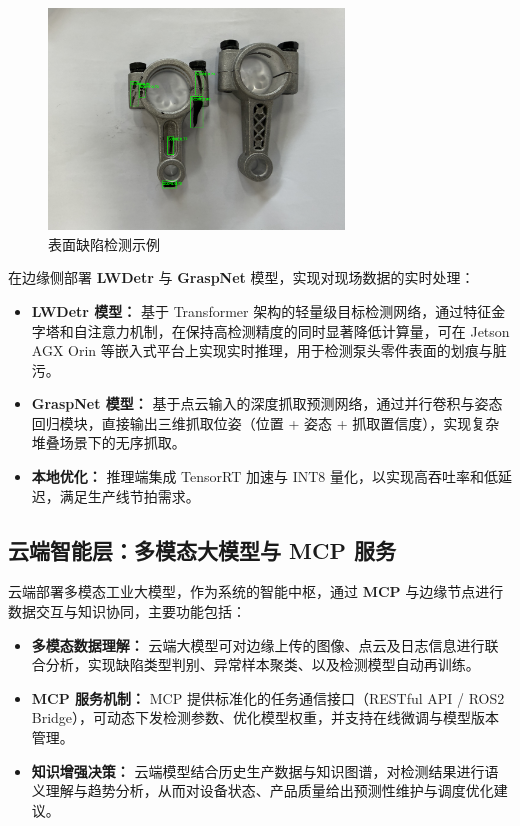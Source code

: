 \documentclass{cumcmthesis}
\begin{document}
\begin{figure}\centering
\includegraphics[width=0.7\textwidth]{result.png}
\caption{表面缺陷检测示例}\label{fig:defect_examples}
\end{figure}
在边缘侧部署 \textbf{LWDetr} 与 \textbf{GraspNet} 模型，实现对现场数据的实时处理：


\begin{itemize}
    \item \textbf{LWDetr 模型：}  
    基于 Transformer 架构的轻量级目标检测网络，通过特征金字塔和自注意力机制，在保持高检测精度的同时显著降低计算量，可在 Jetson AGX Orin 等嵌入式平台上实现实时推理，用于检测泵头零件表面的划痕与脏污。

    \item \textbf{GraspNet 模型：}  
    基于点云输入的深度抓取预测网络，通过并行卷积与姿态回归模块，直接输出三维抓取位姿（位置 + 姿态 + 抓取置信度），实现复杂堆叠场景下的无序抓取。

    \item \textbf{本地优化：}  
    推理端集成 TensorRT 加速与 INT8 量化，以实现高吞吐率和低延迟，满足生产线节拍需求。
\end{itemize}

\subsection{云端智能层：多模态大模型与 MCP 服务}

云端部署多模态工业大模型，作为系统的智能中枢，通过 \textbf{MCP} 与边缘节点进行数据交互与知识协同，主要功能包括：


\begin{itemize}
    \item \textbf{多模态数据理解：}  
    云端大模型可对边缘上传的图像、点云及日志信息进行联合分析，实现缺陷类型判别、异常样本聚类、以及检测模型自动再训练。

    \item \textbf{MCP 服务机制：}  
    MCP 提供标准化的任务通信接口（RESTful API / ROS2 Bridge），可动态下发检测参数、优化模型权重，并支持在线微调与模型版本管理。

    \item \textbf{知识增强决策：}  
    云端模型结合历史生产数据与知识图谱，对检测结果进行语义理解与趋势分析，从而对设备状态、产品质量给出预测性维护与调度优化建议。
\end{itemize}
\end{document}
